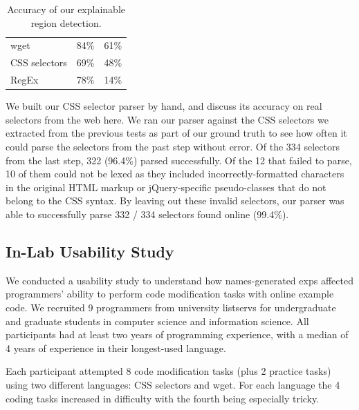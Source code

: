 \begin{changes}
\begin{table}
\caption{Accuracy of our explainable region detection.}
\label{tab:detection_accuracy}
\centering
\begin{tabular}{llc}
\toprule
\headrow{Language} & \headrow{Precision} & \headrow{Recall} \\
\midrule
wget & 84\% & 61\% \\ \midrule
CSS selectors & 69\% & 48\% \\ \midrule
RegEx & 78\% & 14\% \\ \bottomrule
\end{tabular}
\end{table}
\fi

We built our CSS selector parser by hand, and discuss its accuracy on real selectors from the web here. 
We ran our parser against the CSS selectors we extracted from the previous tests as part of our ground truth to see how often it could parse the selectors from the past step without error. 
Of the 334 selectors from the last step, 322 (96.4\%) parsed successfully.
Of the 12 that failed to parse, 10 of them could not be lexed as they included incorrectly-formatted characters in the original HTML markup or jQuery-specific pseudo-classes that do not belong to the CSS syntax.
By leaving out these invalid selectors, our parser was able to successfully parse 332 / 334 selectors found online (99.4\%).

\end{changes}

\subsection{In-Lab Usability Study}

We conducted a usability study to understand how \Glspl{name}-generated \glspl{exp} affected programmers' ability to perform code modification tasks with online example code.
We recruited 9 programmers from university listservs for undergraduate and graduate students in computer science and information science.
All participants had at least two years of programming experience, with a median of 4 years of experience in their longest-used language.

Each participant attempted 8 code modification tasks (plus 2 practice tasks) using two different languages: CSS selectors and wget.
For each language the 4 coding tasks increased in difficulty with the fourth being especially tricky.

